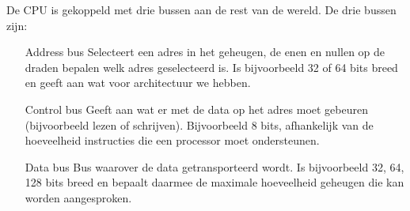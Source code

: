 De CPU is gekoppeld met drie bussen aan de rest van de wereld. De drie bussen zijn:
\begin{itemize}
\item [Address bus] Selecteert een adres in het geheugen, de enen en nullen op de draden bepalen welk adres geselecteerd is. Is bijvoorbeeld 32 of 64 bits breed en geeft aan wat voor architectuur we hebben.
\item [Control bus] Geeft aan wat er met de data op het adres moet gebeuren (bijvoorbeeld lezen of schrijven). Bijvoorbeeld 8 bits, afhankelijk van de hoeveelheid instructies die een processor moet ondersteunen.
\item [Data bus] Bus waarover de data getransporteerd wordt. Is bijvoorbeeld 32, 64, 128 bits breed en bepaalt daarmee de maximale hoeveelheid geheugen die kan worden aangesproken.
\end{itemize}

